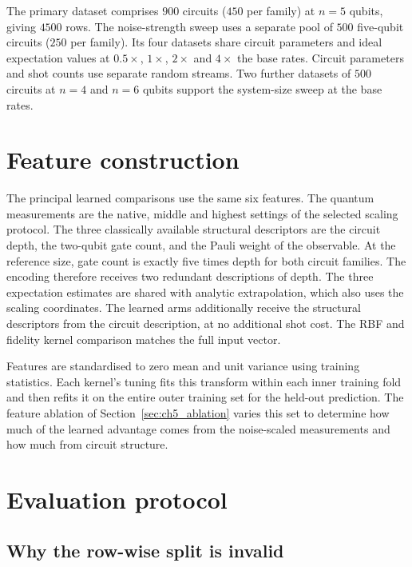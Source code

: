 \documentclass[Thesis.tex]{subfiles}
\begin{document}
The primary dataset comprises $900$ circuits ($450$ per family) at $n = 5$ qubits,
giving $4500$ rows. The noise-strength sweep uses a separate pool of $500$
five-qubit circuits ($250$ per family). Its four datasets share circuit
parameters and ideal expectation values at $0.5\times$, $1\times$, $2\times$
and $4\times$ the base rates. Circuit parameters and shot counts use separate
random streams. Two further datasets of $500$ circuits at $n = 4$ and $n = 6$
qubits support the system-size sweep at the base rates.

\section{Feature construction}\label{sec:ch3_features}

The principal learned comparisons use the same six features. The quantum measurements
are the native, middle and highest settings of the selected scaling protocol.
The three classically available structural descriptors are the circuit depth, the
two-qubit gate count, and the Pauli weight of the observable. At the reference
size, gate count is exactly five times depth for both circuit families. The
encoding therefore receives two redundant descriptions of depth. The three
expectation estimates are shared with analytic extrapolation, which also uses
the scaling coordinates. The learned arms additionally receive the structural
descriptors from the circuit description, at no additional shot cost. The
RBF and fidelity kernel comparison matches the full input vector.

Features are standardised to zero mean and unit variance using training statistics.
Each kernel's tuning fits this transform within each inner training fold and then
refits it on the entire outer training set for the held-out prediction. The
feature ablation of Section~\ref{sec:ch5_ablation} varies this set to determine how
much of the learned advantage comes from the noise-scaled measurements and how much
from circuit structure.

\section{Evaluation protocol}\label{sec:ch3_protocol}

\subsection{Why the row-wise split is invalid}
\end{document}
